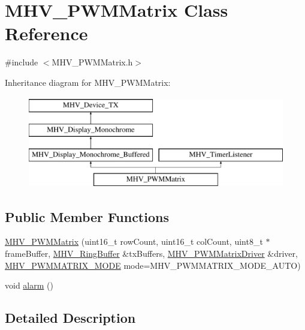 \hypertarget{class_m_h_v___p_w_m_matrix}{
\section{\-M\-H\-V\-\_\-\-P\-W\-M\-Matrix \-Class \-Reference}
\label{class_m_h_v___p_w_m_matrix}
}


{\ttfamily \#include $<$\-M\-H\-V\-\_\-\-P\-W\-M\-Matrix.\-h$>$}

\-Inheritance diagram for \-M\-H\-V\-\_\-\-P\-W\-M\-Matrix\-:\begin{figure}[H]
\begin{center}
\leavevmode
\includegraphics[height=4.000000cm]{class_m_h_v___p_w_m_matrix}
\end{center}
\end{figure}
\subsection*{\-Public \-Member \-Functions}
\begin{DoxyCompactItemize}
\item 
\hyperlink{class_m_h_v___p_w_m_matrix_a7e7b0712beb8f0e43c9c7e806b08e88f}{\-M\-H\-V\-\_\-\-P\-W\-M\-Matrix} (uint16\-\_\-t row\-Count, uint16\-\_\-t col\-Count, uint8\-\_\-t $\ast$frame\-Buffer, \hyperlink{class_m_h_v___ring_buffer}{\-M\-H\-V\-\_\-\-Ring\-Buffer} \&tx\-Buffers, \hyperlink{class_m_h_v___p_w_m_matrix_driver}{\-M\-H\-V\-\_\-\-P\-W\-M\-Matrix\-Driver} \&driver, \hyperlink{_m_h_v___p_w_m_matrix_8h_a6cc1d016b3af074f35a0248396cf6b73}{\-M\-H\-V\-\_\-\-P\-W\-M\-M\-A\-T\-R\-I\-X\-\_\-\-M\-O\-D\-E} mode=\-M\-H\-V\-\_\-\-P\-W\-M\-M\-A\-T\-R\-I\-X\-\_\-\-M\-O\-D\-E\-\_\-\-A\-U\-T\-O)
\item 
void \hyperlink{class_m_h_v___p_w_m_matrix_a15a8c45e7736a53cb2e19a7c2070bb0d}{alarm} ()
\end{DoxyCompactItemize}


\subsection{\-Detailed \-Description}


